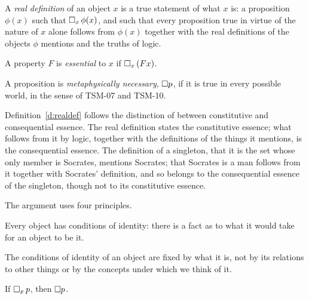 \documentclass{situationist-preprint}
\begin{document}
\begin{definition}\label{d:realdef}
A \emph{real definition} of an object $x$ is a true statement of what $x$ is: a proposition $\phi(x)$ such that $\mathord{\Box}_x\,\phi(x)$, and such that every proposition true in virtue of the nature of $x$ alone follows from $\phi(x)$ together with the real definitions of the objects $\phi$ mentions and the truths of logic.
\end{definition}

\begin{definition}\label{d:essprop}
A property $F$ is \emph{essential} to $x$ if $\mathord{\Box}_x\,(Fx)$.
\end{definition}

\begin{definition}\label{d:nec}
A proposition is \emph{metaphysically necessary}, $\mathord{\Box} p$, if it is true in every possible world, in the sense of TSM-07 and TSM-10.
\end{definition}

Definition~\ref{d:realdef} follows the distinction of \citet{Fine1995Senses} between constitutive and consequential essence. The real definition states the constitutive essence; what follows from it by logic, together with the definitions of the things it mentions, is the consequential essence. The definition of a singleton, that it is the set whose only member is Socrates, mentions Socrates; that Socrates is a man follows from it together with Socrates' definition, and so belongs to the consequential essence of the singleton, though not to its constitutive essence.

The argument uses four principles.

\begin{principle}\label{p:identity}
Every object has conditions of identity: there is a fact as to what it would take for an object to be it.
\end{principle}

\begin{principle}\label{p:fromnature}
The conditions of identity of an object are fixed by what it is, not by its relations to other things or by the concepts under which we think of it.
\end{principle}

\begin{principle}\label{p:impl}
If $\mathord{\Box}_x\,p$, then $\mathord{\Box} p$.
\end{principle}
\end{document}
